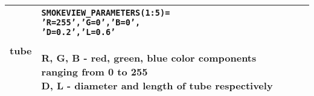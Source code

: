 \begin{longtable}[ht]{|l|l|c|}
tube&
\parbox[c]{\boxwidth}{
{\tt SMOKEVIEW\_PARAMETERS(1:5)=}\\
{\tt 'R=255','G=0','B=0',}\\
{\tt 'D=0.2','L=0.6'}\\ \\
R, G, B - red, green, blue color components ranging from 0 to 255\\
D, L - diameter and length of tube respectively
} &
 \\ \hline


\end{longtable} 